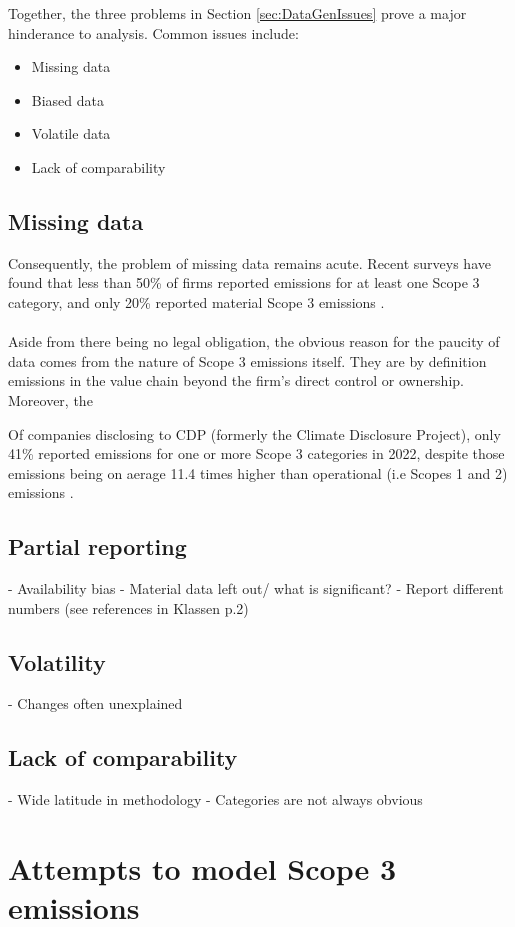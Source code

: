 \documentclass[12pt,twoside]{report}
\begin{document}
Together, the three problems in Section \ref{sec:DataGenIssues} prove a major hinderance to analysis. Common issues include:
\begin{itemize}
	\item Missing data
	\item Biased data
	\item Volatile data
	\item Lack of comparability
\end{itemize}


\subsection{Missing data}
Consequently, the problem of missing data remains acute. Recent surveys have found that less than 50\% of firms reported emissions for at least one Scope 3 category, and only 20\% reported material Scope 3 emissions \cite{cdp2023, ftserussell2024}. 
\\ \\
Aside from there being no legal obligation, the obvious reason for the paucity of data comes from the nature of Scope 3 emissions itself. They are by definition emissions in the value chain beyond the firm's direct control or ownership. Moreover, the 

Of companies disclosing to CDP (formerly the Climate Disclosure Project), only 41\% reported emissions for one or more Scope 3 categories in 2022, despite those emissions being on aerage 11.4 times higher than operational (i.e Scopes 1 and 2) emissions \cite{cdp2022}. 

\subsection{Partial reporting}
- Availability bias
- Material data left out/ what is significant? 
- Report different numbers (see references in Klassen p.2)

\subsection{Volatility}
- Changes often unexplained

\subsection{Lack of comparability}
- Wide latitude in methodology
- Categories are not always obvious

\section{Attempts to model Scope 3 emissions}\label{sec:Scope3Modelling}
\end{document}
